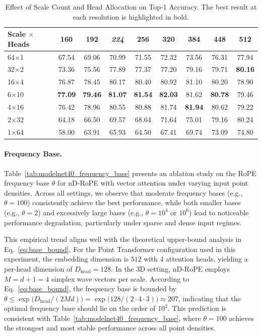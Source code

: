 \documentclass{article}
\theoremstyle{plain}
\theoremstyle{definition}
\theoremstyle{remark}
\begin{document}
\begin{table}[htbp]
\centering
\caption{Effect of Scale Count and Head Allocation on Top-1 Accuracy.
The best result at each resolution is highlighted in bold.}
\label{tab:ablation_random_scales_scaled}
{
\begin{tabular}{lcccccccc}
\toprule
Scale $\times$ Heads
& 160 & 192 & \textit{224} & 256 & 320 & 384 & 448 & 512 \\
\midrule
64$\times$1
& 67.54 & 69.06 & 70.99 & 71.55 & 72.32 & 73.56 & 76.31 & 77.94 \\
32$\times$2
& 73.36 & 75.56 & 77.89 & 77.37 & 77.20 & 79.16 & 79.71 & \textbf{80.16} \\
16$\times$4
& 76.87 & 78.45 & 80.17 & 80.40 & 80.92 & 81.10 & 80.20 & 78.90 \\
6$\times$10
& \textbf{77.09} & \textbf{79.46} & \textbf{81.07} & \textbf{81.54}
& \textbf{82.03} & 81.62 & \textbf{80.78} & 79.46 \\
4$\times$16
& 76.42 & 78.96 & 80.55 & 80.88 & 81.74 & \textbf{81.94} & 80.62 & 79.22 \\
2$\times$32
& 64.18 & 66.50 & 69.57 & 68.64 & 71.64 & 75.01 & 79.16 & 80.24 \\
1$\times$64
& 58.00 & 63.91 & 65.93 & 64.50 & 67.41 & 69.74 & 73.09 & 74.80 \\
\bottomrule
\end{tabular}}
\end{table}

\paragraph{Frequency Base.}
Table~\ref{tab:modelnet40_frequency_base} presents an ablation study on the RoPE frequency base $\theta$ for nD-RoPE with vector attention under varying input point densities. Across all settings, we observe that moderate frequency bases (e.g., $\theta=100$) consistently achieve the best performance, while both smaller bases (e.g., $\theta=2$) and excessively large bases (e.g., $\theta=10^4$ or $10^6$) lead to noticeable performance degradation, particularly under sparse and dense input regimes.

This empirical trend aligns well with the theoretical upper-bound analysis in Eq.~\ref{eq:base_bound}.  For the Point Transformer configuration used in this experiment, the embedding dimension is $512$ with $4$ attention heads, yielding a per-head dimension of $D_{\text{head}}=128$.  In the 3D setting, nD-RoPE employs $M=d+1=4$ simplex wave vectors per scale. According to Eq.~\ref{eq:base_bound}, the frequency base is bounded by $\theta \le \exp\!\bigl(D_{\text{head}} / (2 M d)\bigr) = \exp\!\bigl(128 / (2 \cdot 4 \cdot 3)\bigr) \approx 207$, indicating that the optimal frequency base should lie on the order of $10^2$. This prediction is consistent with Table~\ref{tab:modelnet40_frequency_base}, where $\theta=100$ achieves the strongest and most stable performance across all point densities.
\end{document}
